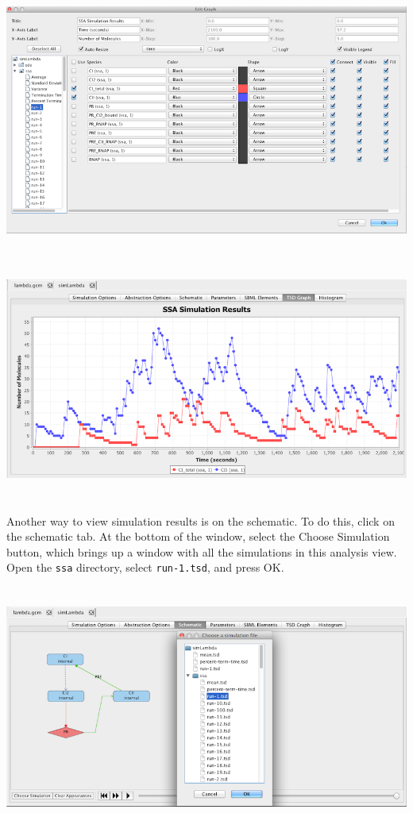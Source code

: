 \documentclass[titlepage,11pt]{article}
\begin{document}
\begin{center}
\includegraphics[height=90mm]{screenshots/ssaResults}\\
\includegraphics[height=80mm]{screenshots/ssaSimResults}
\end{center}

Another way to view simulation results is on the schematic.  To do this, click on the schematic tab.  At the bottom of the window, select the Choose Simulation button, which brings up a window with all the simulations in this analysis view.  Open the {\tt ssa} directory, select {\tt run-1.tsd}, and press OK. 

\begin{center}
\includegraphics[height=80mm]{screenshots/chooseSim}
\end{center}
\end{document}

